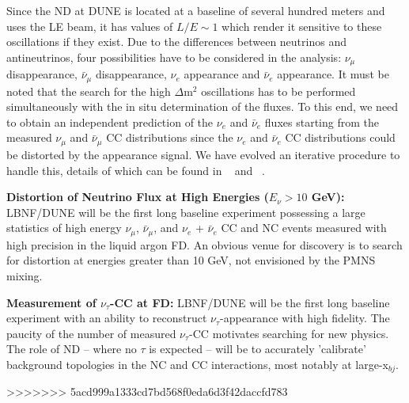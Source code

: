 Since the ND at DUNE  is located at a baseline of several hundred meters  and uses the LE beam, it has values of   $L/E \sim 1$ which render it sensitive to these oscillations if they exist. Due to the differences between neutrinos and antineutrinos,  four possibilities have to be considered in the analysis: $\nu_\mu$ disappearance,  $\bar \nu_\mu$ disappearance, $\nu_e$ appearance and $\bar \nu_e$  appearance. It must be noted that  the search for the high
 $\Delta$m$^2$ oscillations has to be performed simultaneously with the in situ determination of the fluxes. 
To this end, we need to obtain an independent prediction of the $\nu_e$  and $\bar \nu_e$  fluxes starting from the measured $\nu_\mu$ and  $\bar \nu_\mu$ CC distributions since the  $\nu_e$  and $\bar \nu_e$ CC distributions could be distorted by the appearance signal. We have evolved an iterative procedure to handle this, details of which can be found in ~\cite{DPR} and ~\cite{LBNE-SCI}.
 
\vspace{0.25cm} 
\noindent 
{\bf Distortion of Neutrino Flux at High Energies ($E_\nu > 10$ GeV):} 
LBNF/DUNE will be the first long baseline experiment possessing a large 
statistics of high energy $\nu_\mu$,  $\bar \nu_\mu$, and $\nu_e$ + $\bar \nu_e$ CC and NC events 
measured with high precision in the liquid argon FD. An obvious venue for discovery is to 
search for distortion at energies greater than 10 GeV, not envisioned by the 
PMNS mixing. 


\vspace{0.25cm} 
\noindent 
{\bf Measurement of $\nu_\tau$-CC at FD:} 
LBNF/DUNE will be the first long baseline experiment with an ability to 
reconstruct $\nu_\tau$-appearance with high fidelity. The paucity of the number of measured 
$\nu_\tau$-CC motivates searching for new physics. 
The role of ND -- where no $\tau$ is expected -- will be to accurately 'calibrate' background topologies 
in the NC and CC interactions, most notably at large-x$_{bj}$. 


>>>>>>> 5acd999a1333cd7bd568f0eda6d3f42daccfd783
